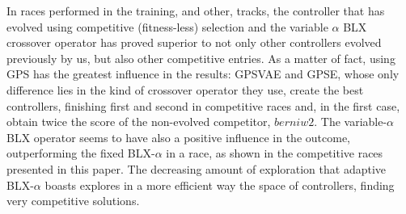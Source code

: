 \documentclass[10pt,journal,compsoc]{IEEEtran}
\begin{document}


In races performed in the training, and other, tracks, the controller
that has evolved using competitive (fitness-less) selection and the
variable $\alpha$ BLX crossover operator has proved superior to not
only other controllers evolved previously by us, but also other
competitive entries. As a matter of fact, using GPS has the greatest 
influence in the results: {\sf GPSVAE} and {\sf GPSE}, whose only
difference lies in the kind of crossover operator they use, create the
best controllers, finishing first and second in competitive races and,
in the first case, obtain twice the score of the non-evolved
competitor, $berniw2$. The variable-$\alpha$ BLX operator seems to
have also a positive influence in the outcome, outperforming the fixed
BLX-$\alpha$ in a race, as shown in the competitive races presented in
this paper. The decreasing amount of exploration that adaptive
BLX-$\alpha$ boasts explores in a more efficient way the space of
controllers, finding very competitive solutions.
\end{document}
